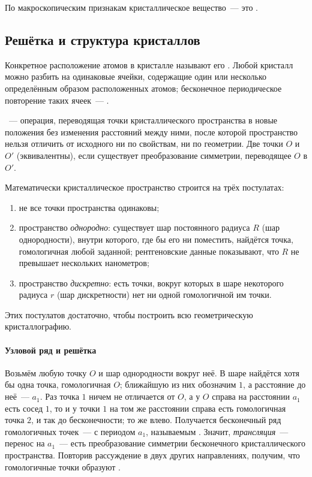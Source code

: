 \begin{glavnoe}
По макроскопическим признакам кристаллическое вещество~— это
.
\end{glavnoe}

\subsection{Решётка и структура кристаллов}\label{ssec:lattice-structure}

Конкретное расположение атомов в кристалле называют его
. Любой кристалл можно разбить на одинаковые ячейки,
содержащие один или несколько определённым образом расположенных атомов;
бесконечное периодическое повторение таких ячеек~— .

\begin{opredelenie}
~— операция, переводящая точки
кристаллического пространства в новые положения без изменения расстояний
между ними, после которой пространство нельзя отличить от исходного ни
по свойствам, ни по геометрии. Две точки $O$ и $O'$ 
(эквивалентны), если существует преобразование симметрии, переводящее $O$
в $O'$.
\end{opredelenie}

Математически кристаллическое пространство строится на трёх
постулатах:
\begin{enumerate}
\item не все точки пространства одинаковы;
\item пространство \emph{однородно}: существует шар постоянного радиуса $R$
(шар однородности), внутри которого, где бы его ни поместить, найдётся
точка, гомологичная любой заданной; рентгеновские данные показывают, что
$R$ не превышает нескольких нанометров;
\item пространство \emph{дискретно}: есть точки, вокруг которых в шаре
некоторого радиуса $r$ (шар дискретности) нет ни одной гомологичной им
точки.
\end{enumerate}
Этих постулатов достаточно, чтобы построить всю геометрическую
кристаллографию.

\paragraph{Узловой ряд и решётка}
Возьмём любую точку $O$ и шар однородности вокруг неё. В шаре найдётся
хотя бы одна точка, гомологичная $O$; ближайшую из них обозначим $1$, а
расстояние до неё~— $a_1$. Раз точка $1$ ничем не отличается от $O$, а у
$O$ справа на расстоянии $a_1$ есть сосед $1$, то и у точки $1$ на том же
расстоянии справа есть гомологичная точка $2$, и так до бесконечности; то
же влево. Получается бесконечный ряд гомологичных точек~—  с периодом $a_1$, называемым . Значит,
\emph{трансляция}~— перенос на $a_1$~— есть преобразование симметрии
бесконечного кристаллического пространства. Повторив рассуждение в двух
других направлениях, получим, что гомологичные точки образуют
.

